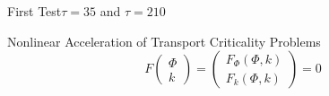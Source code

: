 \documentclass[sans,mathserif,aspectratio=169]{beamer}
\begin{document}
\begin{frame}{First Test}{$\tau = 35$ and $\tau = 210$}
\begin{minipage}{0.45\textwidth} 
    \centering
\end{minipage}
\qquad
\pause
\begin{minipage}{0.45\textwidth}
    \centering
\end{minipage}
\end{frame}

\begin{frame}{Nonlinear Acceleration of Transport Criticality Problems}
\begin{equation}
   F
   \begin{pmatrix}
     \Phi \\
      k
   \end{pmatrix}
   =
   \begin{pmatrix}
     F_\Phi (\Phi, k) \\
     F_k (\Phi, k)
   \end{pmatrix}
   =
   0
\end{equation}
\end{frame}
\end{document}
